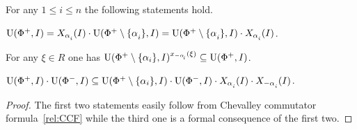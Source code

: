 \begin{lemma}\label{lemma:dv_unipotent} For any $1\leq i\leq n$ the following statements hold. 
\begin{thmlist} \item \label{item-dvu1} $\U(\Phi^+, I) = X_{\alpha\ssub{i}}(I)\cdot \U(\Phi^+\setminus\{\alpha\ssub{i}\}, I) = \U(\Phi^+\setminus\{\alpha\ssub{i}\}, I)\cdot X_{\alpha\ssub{i}}(I)$.
\item \label{item-dvu2} For any $\xi\in R$ one has $\U(\Phi^+\setminus\{\alpha_i\}, I)^{x_{-\alpha\ssub{i}}(\xi)} \subseteq \U(\Phi^+, I)$.
\item \label{item-dvu3} $\U(\Phi^+, I)\cdot \U(\Phi^-, I) \subseteq \U(\Phi^+\setminus \{\alpha_i\}, I) \cdot \U(\Phi^-, I) \cdot X_{\alpha\ssub{i}}(I) \cdot X_{-\alpha\ssub{i}}(I)$.
\end{thmlist} \end{lemma}
\begin{proof} The first two statements easily follow from Chevalley commutator formula~\eqref{rel:CCF} while the third one is a formal consequence of the first two. \end{proof}

